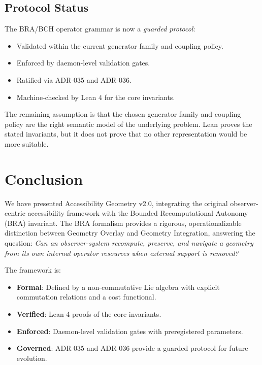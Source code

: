 \documentclass[12pt]{article}
\theoremstyle{plain}
\theoremstyle{definition}
\theoremstyle{remark}
\begin{document}
\subsection{Protocol Status}

The BRA/BCH operator grammar is now a \emph{guarded protocol}:

\begin{itemize}
    \item Validated within the current generator family and coupling policy.
    \item Enforced by daemon-level validation gates.
    \item Ratified via ADR-035 and ADR-036.
    \item Machine-checked by Lean 4 for the core invariants.
\end{itemize}

The remaining assumption is that the chosen generator family and coupling policy are the right semantic model of the underlying problem. Lean proves the stated invariants, but it does not prove that no other representation would be more suitable.

\section{Conclusion}

We have presented Accessibility Geometry v2.0, integrating the original observer-centric accessibility framework with the Bounded Recomputational Autonomy (BRA) invariant. The BRA formalism provides a rigorous, operationalizable distinction between Geometry Overlay and Geometry Integration, answering the question: \emph{Can an observer-system recompute, preserve, and navigate a geometry from its own internal operator resources when external support is removed?}

The framework is:
\begin{itemize}
    \item \textbf{Formal}: Defined by a non-commutative Lie algebra with explicit commutation relations and a cost functional.
    \item \textbf{Verified}: Lean 4 proofs of the core invariants.
    \item \textbf{Enforced}: Daemon-level validation gates with preregistered parameters.
    \item \textbf{Governed}: ADR-035 and ADR-036 provide a guarded protocol for future evolution.
\end{itemize}
\end{document}
